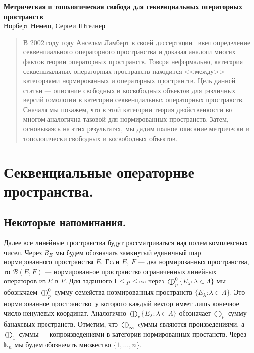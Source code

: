 \documentclass[12pt]{article}
\begin{document}
\begin{center}

\Large \textbf{Метрическая и топологическая свобода для секвенциальных
операторных пространств}\\[0.5cm]
\small {Норберт Немеш, Сергей Штейнер}\\[0.5cm]

\end{center}
\thispagestyle{empty}

\begin{abstract}
В 2002 году году Ансельм Ламберт в своей диссертации~\cite{LamOpFolgen} ввел
определение секвенциального операторного пространства и доказал аналоги многих
фактов теории операторных пространств. Говоря неформально, категория
секвенциальных операторных пространств находится   <<между>> категориями
нормированных и операторных пространств. Цель данной статьи --- описание
свободных и косвободных объектов для различных версий  гомологии в категории
секвенциальных операторных пространств. Сначала мы покажем, что в этой категории
теория двойственности во многом аналогична таковой для нормированных
пространств. Затем, основываясь на этих результатах, мы дадим полное описание
метрически и топологически свободных и косвободных объектов.
\end{abstract}


\section{Секвенциальные операторнве пространства.}


\subsection{Некоторые напоминания.}

Далее все линейные пространства будут рассматриваться над полем комплексных
чисел. Через $B_E$ мы будем обозначать замкнутый единичный шар нормированного
пространства $E$. Если $E$, $F$ --- два нормированных пространства, то
$\mathcal{B}(E, F)$ --- нормированное пространство ограниченных линейных
операторов из $E$ в $F$. Для заданного $1\leq p\leq\infty$ через
$\bigoplus_p^0 \{E_\lambda:\lambda\in\Lambda \}$ мы обозначаем $\bigoplus_p^0$
сумму семейства нормированных пространств $ \{E_\lambda:\lambda\in\Lambda \}$. Это
нормированное пространство, у которого каждый вектор имеет лишь конечное число
ненулевых координат. Аналогично $\bigoplus_p \{E_\lambda:\lambda\in\Lambda \}$
обозначает $\bigoplus_p$-сумму банаховых пространств. Отметим, что
$\bigoplus_\infty$-cуммы являются произведениями, а $\bigoplus_1$-суммы ---
копроизведениями в категории нормированных простанств. Через $\mathbb{N}_n$ мы
будем обозначать множество $ \{1,\ldots,n \}$.
\end{document}
